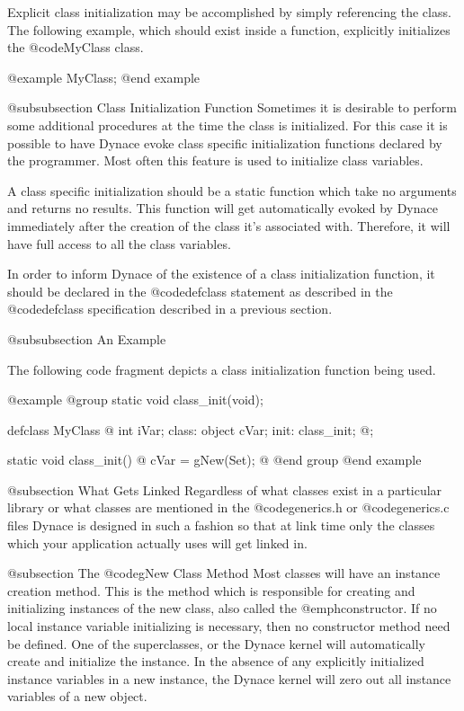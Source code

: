 Explicit class initialization may be accomplished by simply referencing
the class.  The following example, which should exist inside a function,
explicitly initializes the @code{MyClass} class.

@example
        MyClass;
@end example

@subsubsection Class Initialization Function
Sometimes it is desirable to perform some additional procedures at the
time the class is initialized.  For this case it is possible to have
Dynace evoke class specific initialization functions declared by the
programmer.  Most often this feature is used to initialize class
variables.

A class specific initialization should be a static function which
take no arguments and returns no results.  This function will
get automatically evoked by Dynace immediately after the creation
of the class it's associated with.  Therefore, it will have full
access to all the class variables.

In order to inform Dynace of the existence of a class initialization
function, it should be declared in the @code{defclass} statement as
described in the @code{defclass} specification described in a previous
section.


@subsubsection An Example

The following code fragment depicts a class initialization function
being used.

@example
@group
static  void    class_init(void);

defclass  MyClass  @{
        int     iVar;
 class:
        object  cVar;
 init:  class_init;
@};

static  void    class_init()
@{
        cVar = gNew(Set);
@}
@end group
@end example


@subsection What Gets Linked
Regardless of what classes exist in a particular library or what
classes are mentioned in the @code{generics.h} or @code{generics.c}
files Dynace is designed in such a fashion so that at link time
only the classes which your application actually uses will get linked
in.


@subsection The @code{gNew} Class Method
Most classes will have an instance creation method.  This is the method
which is responsible for creating and initializing instances of the new
class, also called the @emph{constructor}.  If no local instance
variable initializing is necessary, then no constructor method need be
defined.  One of the superclasses, or the Dynace kernel will automatically
create and initialize the instance.  In the absence of any explicitly
initialized instance variables in a new instance, the Dynace kernel will
zero out all instance variables of a new object.

